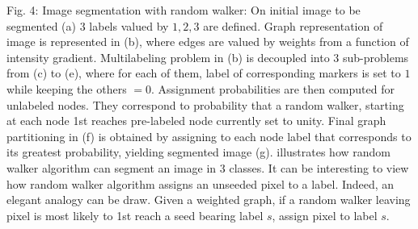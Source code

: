 \documentclass{article}
\begin{document}
\begin{itemize}
\begin{itemize}
        {\sf Fig. 4: Image segmentation with random walker: On initial image to be segmented (a) 3 labels valued by $1,2,3$ are defined. Graph representation of image is represented in (b), where edges are valued by weights from a function of intensity gradient. Multilabeling problem in (b) is decoupled into $3$ sub-problems from (c) to (e), where for each of them, label of corresponding markers is set to $1$ while keeping the others $= 0$. Assignment probabilities are then computed for unlabeled nodes. They correspond to probability that a random walker, starting at each node 1st reaches pre-labeled node currently set to unity. Final graph partitioning in (f) is obtained by assigning to each node label that corresponds to its greatest probability, yielding segmented image (g).} illustrates how random walker algorithm can segment an image in 3 classes. It can be interesting to view how random walker algorithm assigns an unseeded pixel to a label. Indeed, an elegant analogy can be draw. Given a weighted graph, if a random walker leaving pixel is most likely to 1st reach a seed bearing label $s$, assign pixel to label $s$.
        

\end{itemize}
\end{itemize}
\end{document}
